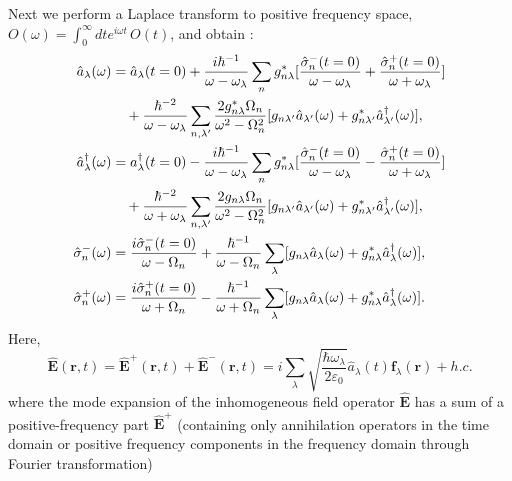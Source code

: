 Next we perform a Laplace transform to positive frequency space,
$O(\omega)=\int_0^\infty dt e^{i\omega t}\, O(t)$, and obtain \cite{Wubs2004}:
\begin{align}
{\hat{a}_\lambda(\omega)}&= \hat{a}_\lambda(t=0) + \frac{i\hbar^{-1}}{\omega-\omega_\lambda}
\sum_n g_{n\lambda}^*[\frac{\hat{\sigma}_n^-(t=0)}{\omega-\omega_\lambda}
+\frac{\hat{\sigma}_n^+(t=0)}{\omega+\omega_\lambda}]\nonumber\\
& \quad + \frac{\hbar^{-2}}{\omega-\omega_\lambda}
\sum_{n,\lambda'} \frac{2g_{n\lambda}^*\Omega_n}{\omega^2-\Omega_n^2} [g_{n\lambda'}
\hat{a}_{\lambda'}(\omega)+g_{n\lambda'}^*\hat{a}_{\lambda'}^\dagger(\omega)], \label{eq:aw} \\
{\hat{a}_\lambda^\dagger(\omega)}&=a^{\dagger}_\lambda(t=0) - \frac{i\hbar^{-1}}{\omega-\omega_\lambda}
\sum_n g_{n\lambda}^*[\frac{\hat{\sigma}_n^-(t=0)}{\omega-\omega_\lambda}
-\frac{\hat{\sigma}_n^+(t=0)}{\omega+\omega_\lambda}]\nonumber\\
& \quad + \frac{\hbar^{-2}}{\omega+\omega_\lambda}
\sum_{n,\lambda'} \frac{2g_{n\lambda}\Omega_n}{\omega^2-\Omega_n^2} [g_{n\lambda'}
\hat{a}_{\lambda'}(\omega)+g_{n\lambda'}^*\hat{a}_{\lambda'}^\dagger(\omega)],
\label{eq:adaggerw} \\
\hat{\sigma}_n^-(\omega)&=\frac{i\hat{\sigma}_n^-(t=0)}
{\omega-\Omega_n}+\frac{\hbar^{-1}}{\omega-\Omega_n}
\sum_{\lambda}[g_{n\lambda}
\hat{a}_\lambda(\omega)+g_{n\lambda}^*\hat{a}_\lambda^\dagger(\omega)], \label{eq:sig-w} \\
\hat{\sigma}_n^+(\omega)&=\frac{i\hat{\sigma}_n^+(t=0)}
{\omega+\Omega_n}-\frac{\hbar^{-1}}{\omega+\Omega_n} \sum_{\lambda}[g_{n\lambda}
\hat{a}_\lambda(\omega)+g_{n\lambda}^*\hat{a}_\lambda^\dagger(\omega)]. \label{eq:sig+w}
\end{align}
%
Here,
\begin{equation}
 \label{eq:Esum}
 \mathbf{\hat{E}}(\mathbf{r},t)=\mathbf{\hat{E}}^+(\mathbf{r},t)+\mathbf{\hat{E}}^-(\mathbf{r},t)=i\sum_\lambda\sqrt{\frac{\hbar
\omega_\lambda}{2\varepsilon_0}}\hat{a}_\lambda(t)\mathbf{f}_\lambda(\mathbf{r})+h.c.
\end{equation}
where the mode expansion of the inhomogeneous field operator $\mathbf{\hat{E}}$
has a sum of a positive-frequency part $\mathbf{\hat{E}}^+$ (containing only annihilation operators in the time domain or positive frequency components in the frequency domain through Fourier transformation)
